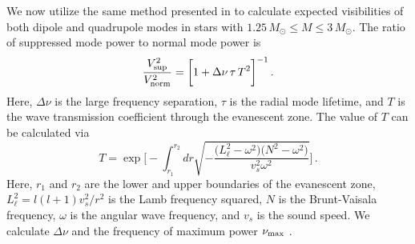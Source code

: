 We now utilize the same method presented in  to calculate expected visibilities of both dipole and quadrupole modes in stars with $1.25 \, M_\odot \leq M \leq 3 \, M_\odot$. The ratio of suppressed mode power to normal mode power is
\begin{equation}
\label{eqn:vsup}
\frac{V_{\rm sup}^2}{V_{\rm norm}^2} = \bigg[ 1 + \Delta \nu \,\tau \,T^2 \bigg]^{-1} \, .
\end{equation}
Here, $\Delta \nu$ is the large frequency separation, $\tau$ is the radial mode lifetime, and $T$ is the wave transmission coefficient through the evanescent zone. The value of $T$ can be calculated via
\begin{equation}
\label{eqn:T}
T  = \exp \bigg[ - \int^{r_2}_{r_1} dr \sqrt{ - \frac{ \big( L_\ell^2 - \omega^2 \big) \big(N^2 - \omega^2 \big) }{v_s^2 \omega^2} } \bigg] \, .
\end{equation}
Here, $r_1$ and $r_2$ are the lower and upper boundaries of the evanescent zone, $L_\ell^2 = l(l+1)v_s^2/r^2$ is the Lamb frequency squared, $N$ is the Brunt-Vaisala frequency, $\omega$ is the angular wave frequency, and $v_s$ is the sound speed. We calculate $\Delta \nu$ and the frequency of maximum power $\nu_{\rm max}$ .